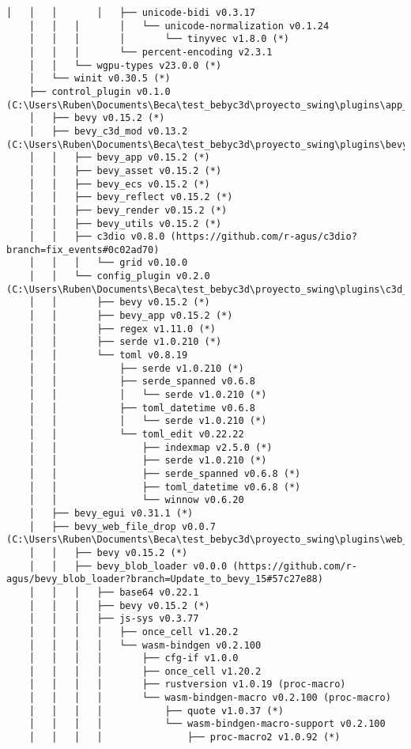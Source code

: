 \begin{lstlisting}[style=mystyle, caption={dependencias del proyecto}, label={lst:dependencias}]
    │   │   │       │   ├── unicode-bidi v0.3.17
    │   │   │       │   └── unicode-normalization v0.1.24
    │   │   │       │       └── tinyvec v1.8.0 (*)
    │   │   │       └── percent-encoding v2.3.1
    │   │   └── wgpu-types v23.0.0 (*)
    │   └── winit v0.30.5 (*)
    ├── control_plugin v0.1.0 (C:\Users\Ruben\Documents\Beca\test_bebyc3d\proyecto_swing\plugins\app_control)
    │   ├── bevy v0.15.2 (*)
    │   ├── bevy_c3d_mod v0.13.2 (C:\Users\Ruben\Documents\Beca\test_bebyc3d\proyecto_swing\plugins\bevy_c3d_mod)
    │   │   ├── bevy_app v0.15.2 (*)
    │   │   ├── bevy_asset v0.15.2 (*)
    │   │   ├── bevy_ecs v0.15.2 (*)
    │   │   ├── bevy_reflect v0.15.2 (*)
    │   │   ├── bevy_render v0.15.2 (*)
    │   │   ├── bevy_utils v0.15.2 (*)
    │   │   ├── c3dio v0.8.0 (https://github.com/r-agus/c3dio?branch=fix_events#0c02ad70)
    │   │   │   └── grid v0.10.0
    │   │   └── config_plugin v0.2.0 (C:\Users\Ruben\Documents\Beca\test_bebyc3d\proyecto_swing\plugins\c3d_config)
    │   │       ├── bevy v0.15.2 (*)
    │   │       ├── bevy_app v0.15.2 (*)
    │   │       ├── regex v1.11.0 (*)
    │   │       ├── serde v1.0.210 (*)
    │   │       └── toml v0.8.19
    │   │           ├── serde v1.0.210 (*)
    │   │           ├── serde_spanned v0.6.8
    │   │           │   └── serde v1.0.210 (*)
    │   │           ├── toml_datetime v0.6.8
    │   │           │   └── serde v1.0.210 (*)
    │   │           └── toml_edit v0.22.22
    │   │               ├── indexmap v2.5.0 (*)
    │   │               ├── serde v1.0.210 (*)
    │   │               ├── serde_spanned v0.6.8 (*)
    │   │               ├── toml_datetime v0.6.8 (*)
    │   │               └── winnow v0.6.20
    │   ├── bevy_egui v0.31.1 (*)
    │   ├── bevy_web_file_drop v0.0.7 (C:\Users\Ruben\Documents\Beca\test_bebyc3d\proyecto_swing\plugins\web_bevy_blob_loader)
    │   │   ├── bevy v0.15.2 (*)
    │   │   ├── bevy_blob_loader v0.0.0 (https://github.com/r-agus/bevy_blob_loader?branch=Update_to_bevy_15#57c27e88)
    │   │   │   ├── base64 v0.22.1
    │   │   │   ├── bevy v0.15.2 (*)
    │   │   │   ├── js-sys v0.3.77
    │   │   │   │   ├── once_cell v1.20.2
    │   │   │   │   └── wasm-bindgen v0.2.100
    │   │   │   │       ├── cfg-if v1.0.0
    │   │   │   │       ├── once_cell v1.20.2
    │   │   │   │       ├── rustversion v1.0.19 (proc-macro)
    │   │   │   │       └── wasm-bindgen-macro v0.2.100 (proc-macro)
    │   │   │   │           ├── quote v1.0.37 (*)
    │   │   │   │           └── wasm-bindgen-macro-support v0.2.100
    │   │   │   │               ├── proc-macro2 v1.0.92 (*)

\end{lstlisting}
